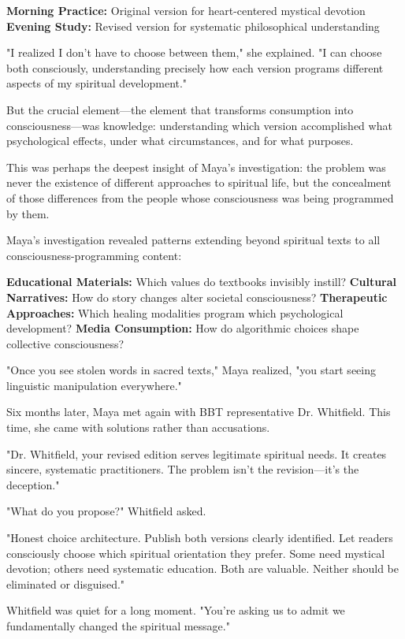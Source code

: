 \documentclass[12pt,twoside]{book}
\begin{document}
\textbf{\textbf{Morning Practice:}} Original version for heart-centered mystical devotion
\textbf{\textbf{Evening Study:}} Revised version for systematic philosophical understanding

"I realized I don't have to choose between them," she explained. "I can choose both consciously, understanding precisely how each version programs different aspects of my spiritual development."

But the crucial element—the element that transforms consumption into consciousness—was knowledge: understanding which version accomplished what psychological effects, under what circumstances, and for what purposes.

This was perhaps the deepest insight of Maya's investigation: the problem was never the existence of different approaches to spiritual life, but the concealment of those differences from the people whose consciousness was being programmed by them.

Maya's investigation revealed patterns extending beyond spiritual texts to all consciousness-programming content:

\textbf{\textbf{Educational Materials:}} Which values do textbooks invisibly instill?
\textbf{\textbf{Cultural Narratives:}} How do story changes alter societal consciousness?
\textbf{\textbf{Therapeutic Approaches:}} Which healing modalities program which psychological development?
\textbf{\textbf{Media Consumption:}} How do algorithmic choices shape collective consciousness?

"Once you see stolen words in sacred texts," Maya realized, "you start seeing linguistic manipulation everywhere."

Six months later, Maya met again with BBT representative Dr. Whitfield. This time, she came with solutions rather than accusations.

"Dr. Whitfield, your revised edition serves legitimate spiritual needs. It creates sincere, systematic practitioners. The problem isn't the revision—it's the deception."

"What do you propose?" Whitfield asked.

"Honest choice architecture. Publish both versions clearly identified. Let readers consciously choose which spiritual orientation they prefer. Some need mystical devotion; others need systematic education. Both are valuable. Neither should be eliminated or disguised."

Whitfield was quiet for a long moment. "You're asking us to admit we fundamentally changed the spiritual message."
\end{document}
